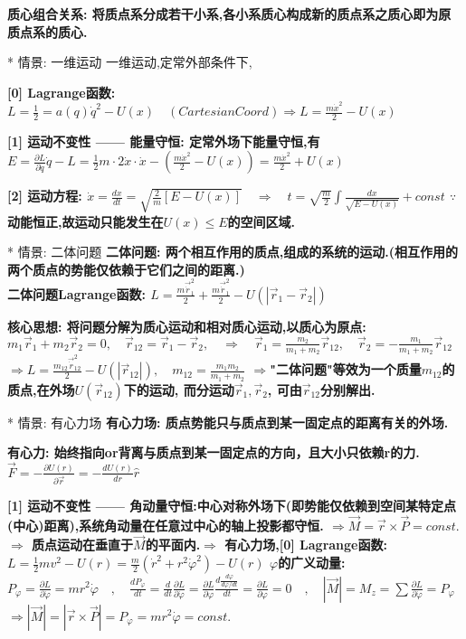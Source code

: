         \bf{质心组合关系}: 将质点系分成若干小系,各小系质心构成新的质点系之质心即为原质点系的质心.


    * 情景: 一维运动
        一维运动,定常外部条件下,
        
        \bf{[0] Lagrange函数}:
            $L = \frac{1}{2} = a(q) \dot q^2 - U(x)\quad (CartesianCoord)\Rightarrow L = \frac{m \dot x^2}{2} - U(x)$
        
        \bf{[1] 运动不变性 —— 能量守恒}: 定常外场下能量守恒,有
            $E = \frac{\partial L}{\partial \dot q}\dot q - L = \frac{1}{2}m\cdot 2 \dot x \cdot \dot x - (\frac{m \dot x^2}{2} - U(x)) = \frac{m \dot x^2}{2} + U(x) $
        
        \bf{[2] 运动方程}:
            $\dot x = \frac{dx}{dt} = \sqrt{\frac{2}{m}[E - U(x)]}\quad \Rightarrow \quad t = \sqrt{\frac{m}{2}} \int \frac{dx}{\sqrt{E - U(x)}} + const$
            $\because$动能恒正,故运动只能发生在$U(x) \leqslant E$的空间区域.


    * 情景: 二体问题
        \bf{二体问题}: 两个相互作用的质点,组成的系统的运动.(相互作用的两个质点的势能仅依赖于它们之间的距离.)\\
        二体问题Lagrange函数:
            $L = \frac{m \vec \dot r_1^2}{2} + \frac{m \vec \dot r_1^2}{2} - U(|\vec r_1 - \vec r_2|)$
        
        \bf{核心思想}: 将问题分解为\bf{质心运动}和\bf{相对质心运动},以质心为原点:
            $m_1\vec r_1 + m_2 \vec r_2 =0,\quad \vec r_{12} = \vec r_1 - \vec r_2, \quad \Rightarrow \quad \vec r_1 = \frac{m_2}{m_1 + m_2}\vec r_{12}, \quad \vec r_2 = - \frac{m_1}{m_1 + m_2}\vec r_{12} $
            $\Rightarrow L = \frac{m_{12} \vec \dot r_{12}^2}{2} - U(|\vec r_{12}|), \quad m_{12} = \frac{m_1 m_2}{m_1 + m_2}$
            $\Rightarrow$"二体问题"等效为一个质量$m_{12}$的质点,在外场$U(\vec r_{12})$下的运动, 而分运动$\vec r_1, \vec r_2$, 可由$\vec r_{12}$分别解出.
        
        
    * 情景: 有心力场
        \bf{有心力场}: 质点势能只与质点到某一固定点的距离有关的外场.
        
        \bf{有心力}: 始终指向or背离与质点到某一固定点的方向，且大小只依赖r的力.
            $\vec F = -\frac{\partial U(r)}{\partial \vec r} = -\frac{d U(r)}{d r} \hat r$
    
        \bf{[1] 运动不变性 —— 角动量守恒}:中心对称外场下(即势能仅依赖到空间某特定点(中心)距离),系统角动量在任意过中心的轴上投影都守恒.
            $\Rightarrow \vec M = \vec r \times \vec P = const.$
            $\Rightarrow$ 质点运动在垂直于$\vec M$的平面内.\quad $\Rightarrow$ 有心力场,\bf{[0] Lagrange函数}:
            $L = \frac{1}{2}m v^2 - U(r) = \frac{m}{2} (\dot r^2 + r^2 \dot \varphi ^2) - U(r)$
            $\varphi$的广义动量:
            $P_\varphi = \frac{\partial L}{\partial \dot \varphi} = m r^2 \dot \varphi \quad , \quad \frac{d P_\varphi}{d t} = \frac{d}{d t}\frac{\partial L}{\partial \dot \varphi} = \frac{\partial L}{\partial \varphi} \frac{d \frac{d \varphi}{d \varphi / d t}}{d t} = \frac{\partial L}{\partial \varphi} = 0 \quad , \quad |\vec M| = M_z = \sum \frac{\partial L}{\partial  \dot \varphi} = P_\varphi$
            $\Rightarrow |\vec M| =| \vec r \times \vec P |= P_\varphi = m r^2 \dot \varphi = const.$
    
